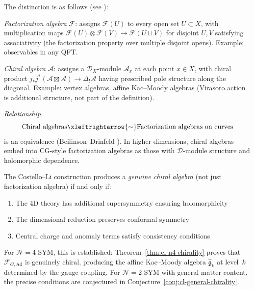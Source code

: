 \begin{remark}\label{rem:fact-vs-chiral}
The distinction is as follows (see ):

\emph{Factorization algebra} $\mathcal{F}$: assigns $\mathcal{F}(U)$ to every open set $U \subset X$, with multiplication maps $\mathcal{F}(U) \otimes \mathcal{F}(V) \to \mathcal{F}(U \sqcup V)$ for disjoint $U, V$ satisfying associativity (the factorization property over multiple disjoint opens).  Example: observables in any QFT.

\emph{Chiral algebra} $\mathcal{A}$: assigns a $\mathcal{D}_X$-module $\mathcal{A}_x$ at each point $x \in X$, with chiral product $j_*j^*(\mathcal{A} \boxtimes \mathcal{A}) \to \Delta_!\mathcal{A}$ having prescribed pole structure along the diagonal.  Example: vertex algebras, affine Kac--Moody algebras (Virasoro action is additional structure, not part of the definition).

\emph{Relationship} \cite{BD04,CG17}.
\[\text{Chiral algebras} \xleftrightarrow{\sim} \text{Factorization algebras on curves}\]
is an equivalence (Beilinson--Drinfeld \cite[Theorem~3.4.9]{BD04}).  In higher dimensions, chiral algebras embed into CG-style factorization algebras as those with $\mathcal{D}$-module structure and holomorphic dependence.
\end{remark}

\begin{conjecture}\label{conj:CL-produces-chiral}
The Costello--Li construction produces a \emph{genuine chiral algebra} (not just
factorization algebra) if and only if:
\begin{enumerate}
\item The 4D theory has additional supersymmetry ensuring holomorphicity
\item The dimensional reduction preserves conformal symmetry
\item Central charge and anomaly terms satisfy consistency conditions
\end{enumerate}

For $\mathcal{N}=4$ SYM, this is established:
Theorem~\ref{thm:cl-n4-chirality} proves that
$\mathcal{F}_{G,\mathrm{Ad}}$ is genuinely chiral, producing the
affine Kac--Moody algebra $\widehat{\mathfrak{g}}_k$ at level~$k$
determined by the gauge coupling.  For $\mathcal{N}=2$ SYM with
general matter content, the precise conditions are conjectured in
Conjecture~\ref{conj:cl-general-chirality}.
\end{conjecture}

